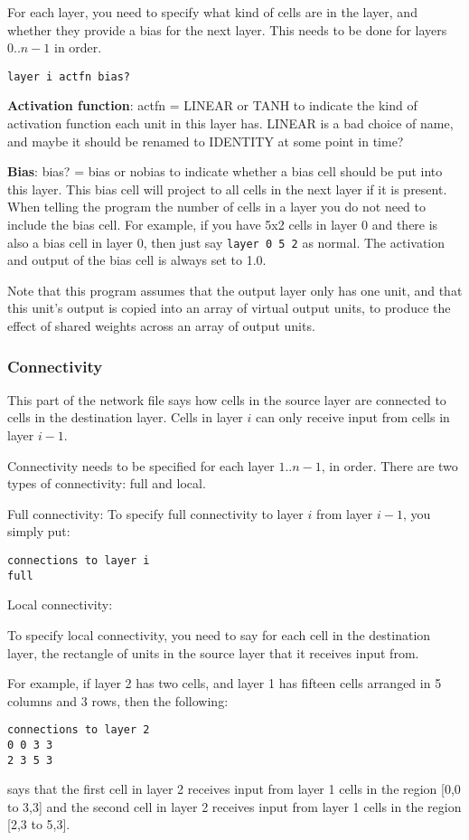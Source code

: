 \documentclass[a4paper]{article}
\begin{document}
For each layer, you need to specify what kind of cells are in the
layer, and whether they provide a bias for the next layer.  This needs
to be done for layers $0..n-1$ in order.

\texttt{layer i actfn bias?}

\textbf{Activation function}: actfn = {LINEAR or TANH} to indicate the kind of
activation function each unit in this layer has. LINEAR is a bad
choice of name, and maybe it should be renamed to IDENTITY at some
point in time?


\textbf{Bias}: bias? = {bias or nobias} to indicate whether a bias
cell should be put into this layer.  This bias cell will project to
all cells in the next layer if it is present.  When telling the
program the number of cells in a layer you do not need to include the
bias cell. For example, if you have 5x2 cells in layer 0 and there is
also a bias cell in layer 0, then just say \texttt{layer 0 5 2} as
normal.  The activation and output of the bias cell is always set to
1.0.

Note that this program assumes that the output layer only has one
unit, and that this unit's output is copied into an array of virtual
output units, to produce the effect of shared weights across an array
of output units.

\subsubsection{Connectivity}
This part of the network file says how cells in the source layer are
connected to cells in the destination layer.  Cells in layer $i$ can
only receive input from cells in layer $i-1$.

Connectivity needs to be specified for each layer $1..n-1$, in order.  
There are two types of connectivity: full and local.

Full connectivity: To specify  full connectivity to layer $i$ from
layer $i-1$, you simply put:

\begin{verbatim}
connections to layer i
full
\end{verbatim}

Local connectivity:

To specify local connectivity, you need to say for each cell in the
destination layer, the rectangle of units in the source layer that it
receives input from.

For example, if layer 2 has two cells, and layer 1 has fifteen cells
arranged in 5 columns and 3 rows, then the following:
\begin{verbatim}
connections to layer 2
0 0 3 3
2 3 5 3
\end{verbatim}
says that the first cell in layer 2 receives input from layer 1 cells
in the region [0,0 to 3,3] and the second cell in layer 2  receives
input from layer 1 cells in the region [2,3 to 5,3].
\end{document}
